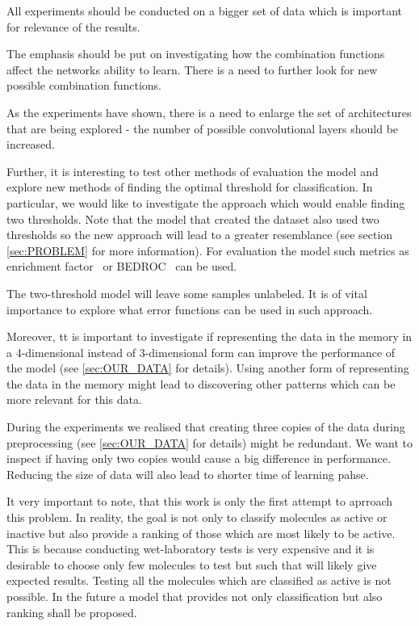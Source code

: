 \documentclass[a4paper,10pt]{report}
\begin{document}
      All experiments should be conducted on a bigger set of data which is important for relevance of the results.
      
      The emphasis should be put on investigating how the combination functions affect the networks ability to learn. There is a need to further look for new possible combination functions.
      
      As the experiments have shown, there is a need to enlarge the set of architectures that are being explored - the number of possible convolutional layers should be increased.
      
      Further, it is interesting to test other methods of evaluation the model and explore new methods of finding the optimal threshold for classification. In particular, we would like to investigate the approach which would enable finding two thresholds. Note that the model that created the dataset also used two thresholds so the new approach will lead to a greater resemblance (see section \ref{sec:PROBLEM} for more information). For evaluation the model such metrics as enrichment factor~\cite{ROC_EF, EF_BEDROC} or BEDROC~\cite{EF_BEDROC} can be used.
      
      The two-threshold model will leave some samples unlabeled. It is of vital importance to explore what error functions can be used in such approach.

      Moreover, tt is important to investigate if representing the data in the memory in a 4-dimensional instead of 3-dimensional form can improve the performance of the model (see \ref{sec:OUR_DATA} for details). Using another form of representing the data in the memory might lead to discovering other patterns which can be more relevant for this data.
      
      During the experiments we realised that creating three copies of the data during preprocessing (see \ref{sec:OUR_DATA} for details) might be redundant. We want to inspect if having only two copies would cause a big difference in performance. Reducing the size of data will also lead to shorter time of learning pahse.
      
      It very important to note, that this work is only the first attempt to aprroach this problem. In reality, the goal is not only to classify molecules as active or inactive but also provide a ranking of those which are most likely to be active. This is because conducting wet-laboratory tests is very expensive and it is desirable to choose only few molecules to test but such that will likely give expected results. Testing all the molecules which are classified as active is not possible. In the future a model that provides not only classification but also ranking shall be proposed.
      
\end{document}
